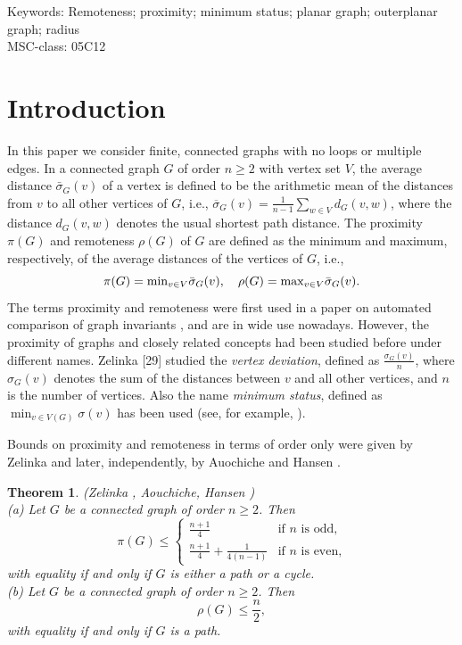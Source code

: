 \documentclass[a4paper,11pt]{article}
\newtheorem{theorem}{Theorem}[section]
\begin{document}
Keywords: Remoteness; proximity; minimum status; planar graph; outerplanar graph; radius \\[5mm]
MSC-class: 05C12 



\section{Introduction}
In this paper we consider finite, connected graphs with no loops or multiple edges. 
In a connected graph $G$ of order $n \geq 2$ with vertex set $V$,
the average distance $\bar{\sigma}_G(v)$ of a vertex is defined to be the arithmetic mean 
of the distances from $v$ to all other vertices of $G$, i.e., $\overline{\sigma}_G(v) = \frac{1}{n-1} \sum_{w \in V} d_G(v,w)$, 
where the distance $d_G(v,w)$ denotes the usual shortest path distance. The proximity $\pi(G)$ 
and remoteness $\rho(G)$ of $G$ are defined as the minimum and maximum, respectively, 
of the average distances of the vertices of $G$, i.e.,  
\[\pi(G)={\rm min}_{v\in V}\bar{\sigma}_G(v), \quad \rho(G)={\rm max}_{v\in V}\bar{\sigma}_G(v). \] 
The terms proximity and remoteness were first used in a paper on automated comparison of graph invariants 
\cite{AouCapHan2007}, and are in wide use nowadays. However, the proximity of graphs and closely related concepts 
had been studied before under different names.  
Zelinka  [29] studied the {\em vertex deviation}, defined as $\frac{\sigma_G(v)}{n}$, 
where $\sigma_G(v)$ denotes the sum of the distances between $v$ and all other vertices,
and $n$ is the number of vertices.
Also the name {\em minimum status}, defined as $\min_{v \in V(G)} \sigma(v)$ has been used (see, for example, \cite{LiaZhoGuo2021}).


Bounds on proximity and remoteness in terms of order only were given by Zelinka \cite{Zel1968} 
and later, independently, by Auochiche and Hansen \cite{AouHan2011}. 

\begin{theorem}\label{Zel1968AouHan2011}
{\rm (Zelinka \cite{Zel1968}, Aouchiche, Hansen \cite{AouHan2011})} \\
(a) Let $G$ be a connected graph of order $n\geq 2$. Then
\[ \pi(G) \leq \left\{ \begin{array}{cc}
  \frac{n+1}{4} & \textrm{if $n$ is odd,} \\ 
  \frac{n+1}{4} + \frac{1}{4(n-1)} & \textrm{if $n$ is even,} 
       \end{array} \right. \]
with equality if and only if $G$ is either a path or a cycle. \\
(b) Let $G$ be a connected graph of order $n\geq 2$. Then        
\[ \rho(G) \leq \frac{n}{2}, \]
with equality if and only if $G$ is a path.
\end{theorem}
\end{document}
